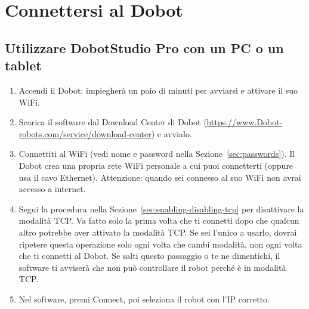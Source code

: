 \documentclass[11pt,a4paper]{article}
\begin{document}
\section{Connettersi al Dobot}
\label{sec:connecting}

\subsection{Utilizzare DobotStudio Pro con un PC o un tablet}
\label{sec:connecting-dobotstudio}

\begin{enumerate}[leftmargin=1.2cm]
    \item Accendi il Dobot: impiegherà un paio di minuti per avviarsi e attivare il suo WiFi.
    \item Scarica il software dal Download Center di Dobot (\url{https://www.Dobot-robots.com/service/download-center}) e avvialo.
    \item Connettiti al WiFi (vedi nome e password nella Sezione~\ref{sec:passwords}). Il Dobot crea una propria rete WiFi personale a cui puoi connetterti (oppure usa il cavo Ethernet). Attenzione: quando sei connesso al suo WiFi non avrai accesso a internet.
    \item Segui la procedura nella Sezione~\ref{sec:enabling-disabling-tcp} per disattivare la modalità TCP. Va fatto solo la prima volta che ti connetti dopo che qualcun altro potrebbe aver attivato la modalità TCP. Se sei l'unico a usarlo, dovrai ripetere questa operazione solo ogni volta che cambi modalità, non ogni volta che ti connetti al Dobot. Se salti questo passaggio o te ne dimentichi, il software ti avviserà che non può controllare il robot perché è in modalità TCP.
    \item Nel software, premi Connect, poi seleziona il robot con l'IP corretto.
\end{enumerate}

%
\end{document}
